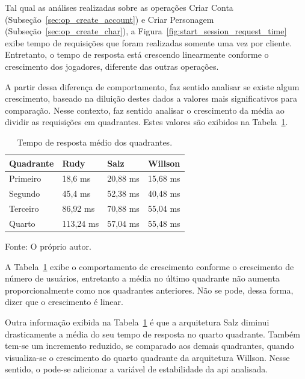 Tal qual as análises realizadas sobre as operações Criar Conta (Subseção~\ref{sec:op_create_account}) e Criar Personagem (Subseção~\ref{sec:op_create_char}), a Figura~\ref{fig:start_session_request_time} exibe tempo de requisições que foram realizadas somente uma vez por cliente.
%
Entretanto, o tempo de resposta está crescendo linearmente conforme o crescimento dos jogadores, diferente das outras operações.

A partir dessa diferença de comportamento, faz sentido analisar se existe algum crescimento, baseado na diluição destes dados a valores mais significativos para comparação.
%
Nesse contexto, faz sentido analisar o crescimento da média ao dividir as requisições em quadrantes.
%
Estes valores são exibidos na Tabela~\ref{tab:op_start_session}.

\begin{table}[htb!]
\centering
\begin{adjustbox}{max width=\textwidth}
\caption{Tempo de resposta médio dos quadrantes.}
\label{tab:op_start_session}
\begin{tabular}{l|l|l|l}

\hline \hline

Quadrante & Rudy    & Salz    & Willson \\ \hline \hline

Primeiro  & 18,6 ms & 20,88 ms & 15,68 ms \\ \hline

Segundo   & 45,4 ms & 52,38 ms & 40,48 ms \\ \hline

Terceiro  & 86,92 ms & 70,88 ms & 55,04 ms \\ \hline

Quarto    & 113,24 ms & 57,04 ms & 55,48 ms \\ \hline \hline

\end{tabular}

\end{adjustbox}

Fonte: O próprio autor.
\end{table}

A Tabela~\ref{tab:op_start_session} exibe o comportamento de crescimento conforme o crescimento de número de usuários, entretanto a média no último quadrante não aumenta proporcionalmente como nos quadrantes anteriores.
%
Não se pode, dessa forma, dizer que o crescimento é linear.

Outra informação exibida na Tabela~\ref{tab:op_start_session} é que a arquitetura Salz diminui drasticamente a média do seu tempo de resposta no quarto quadrante.
%
Também tem-se um incremento reduzido, se comparado aos demais quadrantes, quando visualiza-se o crescimento do quarto quadrante da arquitetura Willson.
%
Nesse sentido, o pode-se adicionar a variável de estabilidade da \ac{api} analisada.

